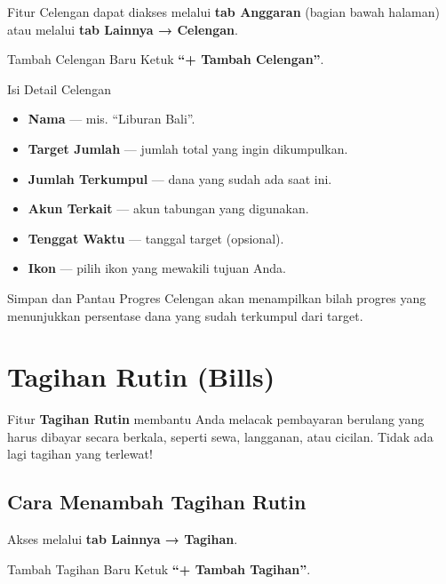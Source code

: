 \documentclass[12pt, a4paper]{article}
\begin{document}
Fitur Celengan dapat diakses melalui \textbf{tab Anggaran} (bagian bawah halaman) atau melalui \textbf{tab Lainnya → Celengan}.

\begin{stepbox}{Tambah Celengan Baru}
  Ketuk \textbf{``+ Tambah Celengan''}.
\end{stepbox}

\begin{stepbox}{Isi Detail Celengan}
  \begin{itemize}[leftmargin=1em, itemsep=2pt]
    \item \textbf{Nama} --- mis. ``Liburan Bali''.
    \item \textbf{Target Jumlah} --- jumlah total yang ingin dikumpulkan.
    \item \textbf{Jumlah Terkumpul} --- dana yang sudah ada saat ini.
    \item \textbf{Akun Terkait} --- akun tabungan yang digunakan.
    \item \textbf{Tenggat Waktu} --- tanggal target (opsional).
    \item \textbf{Ikon} --- pilih ikon yang mewakili tujuan Anda.
  \end{itemize}
\end{stepbox}

\begin{stepbox}{Simpan dan Pantau Progres}
  Celengan akan menampilkan bilah progres yang menunjukkan persentase dana yang sudah terkumpul dari target.
\end{stepbox}

\section{Tagihan Rutin (Bills)}

Fitur \textbf{Tagihan Rutin} membantu Anda melacak pembayaran berulang yang harus dibayar secara berkala, seperti sewa, langganan, atau cicilan. Tidak ada lagi tagihan yang terlewat!

\subsection{Cara Menambah Tagihan Rutin}

Akses melalui \textbf{tab Lainnya → Tagihan}.

\begin{stepbox}{Tambah Tagihan Baru}
  Ketuk \textbf{``+ Tambah Tagihan''}.
\end{stepbox}
\end{document}
